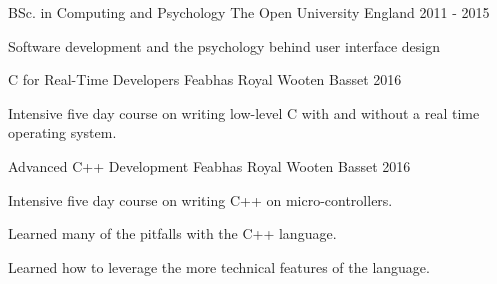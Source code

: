 

\begin{cventries}

  \cventry
    {BSc. in Computing and Psychology} %
    {The Open University} %
    {England } %
    {2011 - 2015} %
    {
      \begin{cvitems} %
       \item { Software development and the psychology behind user interface design }
      \end{cvitems}
    }

    \cventry
    {C for Real-Time Developers} %
    {Feabhas} %
    {Royal Wooten Basset } %
    {2016} %
    {
      \begin{cvitems} %
        \item {Intensive five day course on writing low-level C with and without a real time operating system.}
      \end{cvitems}
    }

    \cventry
    {Advanced C++ Development} %
    {Feabhas} %
    {Royal Wooten Basset } %
    {2016} %
    {
      \begin{cvitems} %
        \item {Intensive five day course on writing  C++ on micro-controllers.}
        \item {Learned many of the pitfalls with the C++ language.}
        \item {Learned how to leverage the more technical features of the language.}
      \end{cvitems}
    }

\end{cventries}
